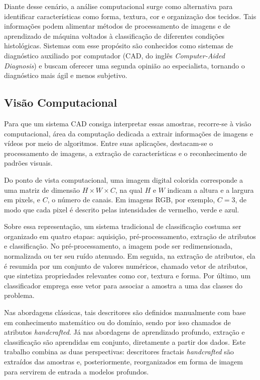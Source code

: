 Diante desse cenário, a análise computacional surge como alternativa para identificar características como forma, textura, cor e organização dos tecidos. Tais informações podem alimentar métodos de processamento de imagens e de aprendizado de máquina voltados à classificação de diferentes condições histológicas. Sistemas com esse propósito são conhecidos como sistemas de diagnóstico auxiliado por computador (CAD, do inglês \textit{Computer-Aided Diagnosis}) e buscam oferecer uma segunda opinião ao especialista, tornando o diagnóstico mais ágil e menos subjetivo. %

\subsection{Visão Computacional}
\hspace{+15pt}

Para que um sistema CAD consiga interpretar essas amostras, recorre-se à visão computacional, área da computação dedicada a extrair informações de imagens e vídeos por meio de algoritmos. Entre suas aplicações, destacam-se o processamento de imagens, a extração de características e o reconhecimento de padrões visuais.

Do ponto de vista computacional, uma imagem digital colorida corresponde a uma matriz de dimensão $H \times W \times C$, na qual $H$ e $W$ indicam a altura e a largura em pixels, e $C$, o número de canais. Em imagens RGB, por exemplo, $C = 3$, de modo que cada pixel é descrito pelas intensidades de vermelho, verde e azul.

Sobre essa representação, um sistema tradicional de classificação costuma ser organizado em quatro etapas: aquisição, pré-processamento, extração de atributos e classificação. No pré-processamento, a imagem pode ser redimensionada, normalizada ou ter seu ruído atenuado. Em seguida, na extração de atributos, ela é resumida por um conjunto de valores numéricos, chamado vetor de atributos, que sintetiza propriedades relevantes como cor, textura e forma. Por último, um classificador emprega esse vetor para associar a amostra a uma das classes do problema. %

Nas abordagens clássicas, tais descritores são definidos manualmente com base em conhecimento matemático ou do domínio, sendo por isso chamados de atributos \textit{handcrafted}. Já nas abordagens de aprendizado profundo, extração e classificação são aprendidas em conjunto, diretamente a partir dos dados. Este trabalho combina as duas perspectivas: descritores fractais \textit{handcrafted} são extraídos das amostras e, posteriormente, reorganizados em forma de imagem para servirem de entrada a modelos profundos.

